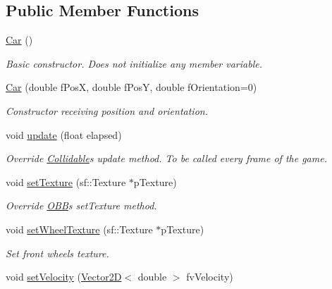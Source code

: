 \subsection*{Public Member Functions}
\begin{DoxyCompactItemize}
\item 
\hypertarget{class_car_a1c803f7c5038d3e31b368b0d0a35493c}{}\hyperlink{class_car_a1c803f7c5038d3e31b368b0d0a35493c}{Car} ()\label{class_car_a1c803f7c5038d3e31b368b0d0a35493c}

\begin{DoxyCompactList}\small\item\em Basic constructor. Does not initialize any member variable. \end{DoxyCompactList}\item 
\hyperlink{class_car_ab941f06b66d0b9b4a7d6f2ec72494660}{Car} (double f\+Pos\+X, double f\+Pos\+Y, double f\+Orientation=0)
\begin{DoxyCompactList}\small\item\em Constructor receiving position and orientation. \end{DoxyCompactList}\item 
void \hyperlink{class_car_ab7860fcfd5e75787d358128e04442464}{update} (float elapsed)
\begin{DoxyCompactList}\small\item\em Override \hyperlink{class_collidable}{Collidable}\textquotesingle{}s update method. To be called every frame of the game. \end{DoxyCompactList}\item 
void \hyperlink{class_car_a179e5e7f3d69e65d1ffa582d32259791}{set\+Texture} (sf\+::\+Texture $\ast$p\+Texture)
\begin{DoxyCompactList}\small\item\em Override \hyperlink{class_o_b_b}{O\+B\+B}\textquotesingle{}s set\+Texture method. \end{DoxyCompactList}\item 
void \hyperlink{class_car_a73e1aac426beef99001e87be0fa541c8}{set\+Wheel\+Texture} (sf\+::\+Texture $\ast$p\+Texture)
\begin{DoxyCompactList}\small\item\em Set front wheels texture. \end{DoxyCompactList}\item 
\hypertarget{class_car_abd60b234c10b8ca0c637069c9c341b7a}{}void \hyperlink{class_car_abd60b234c10b8ca0c637069c9c341b7a}{set\+Velocity} (\hyperlink{class_vector2_d}{Vector2\+D}$<$ double $>$ fv\+Velocity)\label{class_car_abd60b234c10b8ca0c637069c9c341b7a}


\end{DoxyCompactItemize}
